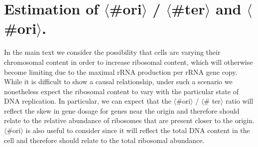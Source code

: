 \begin{figure}
    \begin{fullwidth}
\end{fullwidth}
\end{figure}

\section{Estimation of $\langle$\#ori$\rangle$ / $\langle$\#ter$\rangle$ and $\langle$\#ori$\rangle$.}

In the main text we consider the possibility that cells are varying their
chromosomal content in order to increase ribosomal content, which will otherwise
become limiting due to the maximal rRNA production per rRNA gene copy. While it is
difficult to show a causal relationship, under such a scenario we nonetheless
expect the ribosomal content to vary with the particular state of DNA
replication. In particular, we can expect that the $\langle$\#ori$\rangle$ /
$\langle$\# ter$\rangle$ ratio will reflect the skew in gene dosage for genes
near the origin and therefore should relate to the relative abundance of
ribosomes that are present closer to the origin.  $\langle$\#ori$\rangle$ is
also useful to consider since it will reflect the total DNA content in the cell
and therefore should relate to the total ribosomal abundance.

